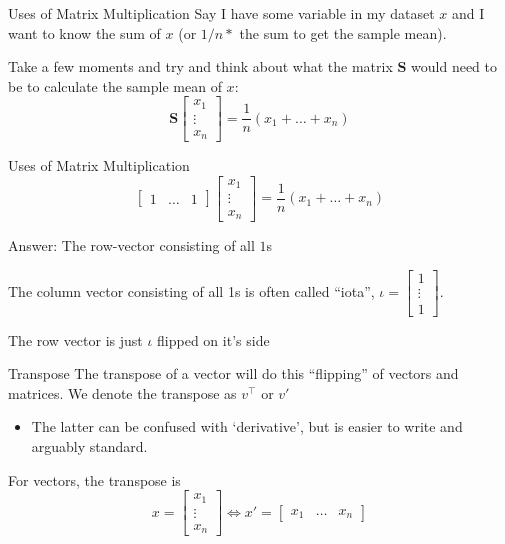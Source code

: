 \documentclass[aspectratio=169,t,11pt,table]{beamer}
\begin{document}
\begin{frame}{Uses of Matrix Multiplication}
  Say I have some variable in my dataset $x$ and I want to know the sum of $x$ (or $1/n * $ the sum to get the sample mean). 

  \bigskip
  Take a few moments and try and think about what the matrix $\bm{S}$ would need to be to calculate the sample mean of $x$:
  $$
    \bm{S} \begin{bmatrix} x_1 \\ \vdots \\ x_n \end{bmatrix} = \frac{1}{n} \left( x_1 + \dots + x_n \right)
  $$
\end{frame}

\begin{frame}{Uses of Matrix Multiplication}
  \vspace*{-\bigskipamount}
  $$
    \begin{bmatrix} 1 & \dots & 1 \end{bmatrix} \begin{bmatrix} x_1 \\ \vdots \\ x_n \end{bmatrix} = \frac{1}{n} \left( x_1 + \dots + x_n \right)
  $$

  Answer: The \alert{row-vector} consisting of all $1$s 

  \pause
  \bigskip
  The column vector consisting of all 1s is often called ``iota'', $\iota = \begin{bmatrix}1 \\ \vdots \\ 1\end{bmatrix}$. 
  
  \smallskip
  The row vector is just $\iota$ flipped on it's side
\end{frame}

\begin{frame}{Transpose}
  The \alert{transpose} of a vector will do this ``flipping'' of vectors and matrices. We denote the transpose as $v^{\top}$ or $v'$
  \begin{itemize}
    \item The latter can be confused with `derivative', but is easier to write and arguably standard.
  \end{itemize}

  For vectors, the transpose is
  $$
    x = \begin{bmatrix} x_1 \\ \vdots \\ x_n \end{bmatrix} \iff x' = \begin{bmatrix} x_1 & \dots & x_n \end{bmatrix}
  $$
\end{frame}
\end{document}
